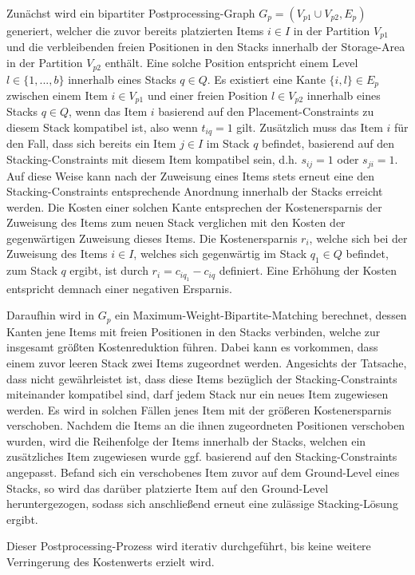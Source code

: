 Zunächst wird ein bipartiter Postprocessing-Graph $G_p = (V_{p1} \cup V_{p2}, E_p)$ generiert, welcher die zuvor bereits platzierten Items $i \in I$ in der Partition $V_{p1}$ und die verbleibenden freien Positionen in den Stacks innerhalb der Storage-Area in der Partition $V_{p2}$ enthält. Eine solche Position entspricht einem Level $l \in \{1, ..., b\}$ innerhalb eines Stacks $q \in Q$. Es existiert eine Kante $\{i, l\} \in E_p$ zwischen einem Item $i \in V_{p1}$ und einer freien Position $l \in V_{p2}$ innerhalb eines Stacks $q \in Q$, wenn das Item $i$ basierend auf den Placement-Constraints zu diesem Stack kompatibel ist, also wenn $t_{iq} = 1$ gilt. Zusätzlich muss das Item $i$ für den Fall, dass sich bereits ein Item $j \in I$ im Stack $q$ befindet, basierend auf den Stacking-Constraints mit diesem Item kompatibel sein, d.h. $s_{ij} = 1$ oder $s_{ji} = 1$.
Auf diese Weise kann nach der Zuweisung eines Items stets erneut eine den Stacking-Constraints entsprechende Anordnung innerhalb der Stacks erreicht werden. Die Kosten einer solchen Kante entsprechen der Kostenersparnis der Zuweisung des Items zum neuen Stack verglichen mit den Kosten der gegenwärtigen Zuweisung dieses Items. Die Kostenersparnis $r_i$, welche sich bei der Zuweisung des Items $i \in I$, welches sich gegenwärtig im Stack $q_1 \in Q$ befindet, zum Stack $q$ ergibt, ist durch $r_i = c_{iq_1} - c_{iq}$ definiert. Eine Erhöhung der Kosten entspricht demnach einer negativen Ersparnis.

Daraufhin wird in $G_p$ ein Maximum-Weight-Bipartite-Matching berechnet, dessen Kanten jene Items mit freien
Positionen in den Stacks verbinden, welche zur insgesamt größten Kostenreduktion führen.
Dabei kann es vorkommen, dass einem zuvor leeren Stack zwei Items zugeordnet werden. Angesichts der Tatsache,
dass nicht gewährleistet ist, dass diese Items bezüglich der Stacking-Constraints miteinander kompatibel sind,
darf jedem Stack nur ein neues Item zugewiesen werden.
Es wird in solchen Fällen jenes Item mit der größeren Kostenersparnis verschoben.
Nachdem die Items an die ihnen zugeordneten Positionen verschoben wurden,
wird die Reihenfolge der Items innerhalb der Stacks, welchen ein zusätzliches Item zugewiesen
wurde ggf. basierend auf den Stacking-Constraints angepasst.
Befand sich ein verschobenes Item zuvor auf dem Ground-Level eines Stacks,
so wird das darüber platzierte Item auf den Ground-Level heruntergezogen,
sodass sich anschließend erneut eine zulässige Stacking-Lösung ergibt.

Dieser Postprocessing-Prozess wird iterativ durchgeführt, bis keine weitere Verringerung des Kostenwerts erzielt wird.

